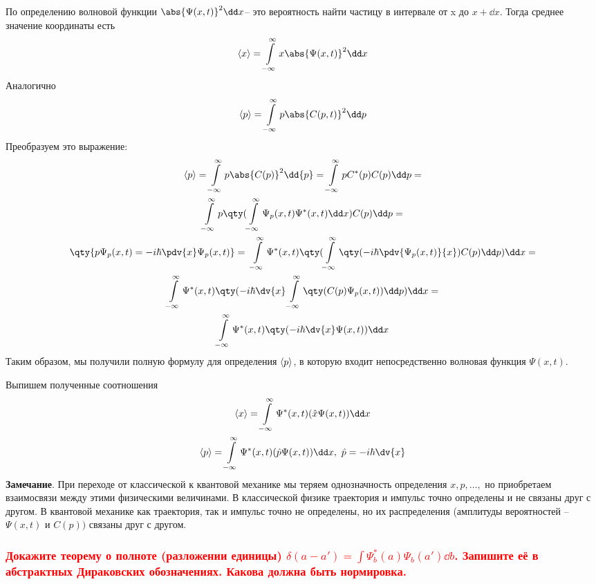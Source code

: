По определению волновой функции $\abs{\Psi(x,t)}^2 \dd x$-- это вероятность найти частицу в интервале от x до $x+\dd x$. Тогда среднее значение координаты есть
$$\mean{x}=\infint x\abs{\Psi(x,t)}^2 \dd x $$
Аналогично 
$$\mean{p}=\infint p\abs{C(p,t)}^2 \dd p $$ 
Преобразуем это выражение:
\begin{gather*}
	\mean{p}=\infint p\abs{C(p)}^2 \dd{p}=\infint pC^*(p)C(p)\dd p=\\
	\infint p \qty(\infint\Psi_p(x,t) \Psi^*(x,t) \dd x) C(p) \dd p =\\
	\qty{ p\Psi_p(x,t)=-i\hbar\pdv{x} \Psi_p(x,t)}=\
	\infint \Psi^*(x,t)\qty(\infint\qty(-i\hbar\pdv{\Psi_p(x,t)}{x}) C(p) \dd p)\dd x=\\
	\infint \Psi^*(x,t)\qty(-i\hbar\dv{x} \infint\qty(C(p)\Psi_p(x,t)) \dd p)\dd x=\\
	\infint \Psi^*(x,t)\qty(-i\hbar \dv{x} \Psi(x,t))\dd x
\end{gather*}
Таким образом, мы получили полную формулу для определения $\langle p\rangle$, в которую входит непосредственно волновая функция $\Psi(x,t)$.

Выпишем полученные соотношения
\begin{gather*}
	\mean{x}=\infint \Psi^*(x,t)(\hat{x} \Psi(x,t)) \dd x\\
	\mean{p}=\infint \Psi^*(x,t)(\hat{p} \Psi(x,t)) \dd x,~\hat p=-i\hbar\dv{x}
\end{gather*}
\textbf{Замечание}. При переходе от классической к квантовой механике
мы теряем однозначность определения $x, p, \dots,$ но приобретаем взаимосвязи между этими физическими величинами. В классической физике траектория и импульс точно определены и не связаны друг с
другом. В квантовой механике как траектория, так и импульс точно не определены, но их распределения (амплитуды вероятностей –
$\Psi(x, t)$ и $C(p))$ связаны друг с другом.

 
\subsubsection{\textcolor{red} {Докажите теорему о полноте (разложении единицы)
$\delta(a-a')=\int\Psi_b^*(a)\Psi_b(a')\dd{b}$.
Запишите её в абстрактных Дираковских обозначениях. Какова должна быть
нормировка.} }